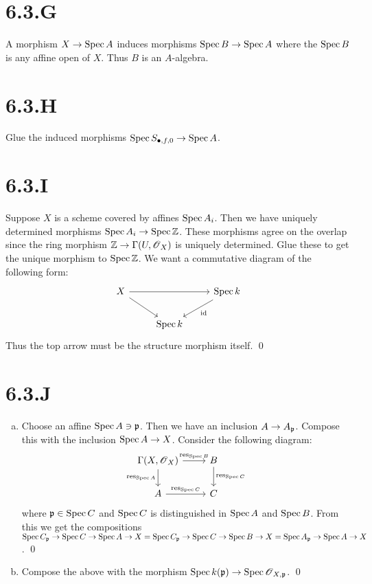 \documentclass{article}
\begin{document}
\section{6.3.G}
A morphism $X \to \operatorname{Spec} A$ induces morphisms $\operatorname{Spec} B \to \operatorname{Spec} A$ where the $\operatorname{Spec} B$ is any affine open of $X$. Thus $B$ is an $A$-algebra.

\section{6.3.H}
Glue the induced morphisms $\operatorname{Spec} S_{\bullet, f, 0} \to \operatorname{Spec} A$.

\section{6.3.I}
Suppose $X$ is a scheme covered by affines $\operatorname{Spec} A_i$. Then we have uniquely determined morphisms $\operatorname{Spec} A_i \to \operatorname{Spec} \mathbb{Z}$. These morphisms agree on the overlap since the ring morphism $\mathbb{Z} \to \Gamma(U, \operatorname{\mathscr{O}}_X)$ is uniquely determined. Glue these to get the unique morphism to $\operatorname{Spec} \mathbb{Z}$.
We want a commutative diagram of the following form:
\[
    \begin{tikzcd}
        X \ar[rr] \ar[dr] &         & \Spec k \ar[dl, "\text{id}"] \\
                          & \Spec k
    \end{tikzcd}
\]
Thus the top arrow must be the structure morphism itself. \qed

\section{6.3.J}
\begin{enumerate}[a.]
    \item Choose an affine $\operatorname{Spec} A \ni \mathfrak{p}$. Then we have an inclusion $A \to A_{\mathfrak{p}}$. Compose this with the inclusion $\operatorname{Spec} A \to X$. Consider the following diagram:
          \[
              \begin{tikzcd}
                  \Gamma(X, \Osh_X) \ar[d, "\operatorname{res}_{\Spec A}", swap] \ar[r, "\operatorname{res}_{\Spec B}"] & B\ar[d, "\operatorname{res}_{\Spec C}"] \\
                  A \ar[r, "\operatorname{res}_{\Spec C}"]                                                              & C
              \end{tikzcd}
          \]
          where $\mathfrak{p} \in \operatorname{Spec} C$ and $\operatorname{Spec} C$ is distinguished in $\operatorname{Spec} A$ and $\operatorname{Spec} B$. From this we get the compositions $\operatorname{Spec} C_{\mathfrak{p}} \to \operatorname{Spec} C \to \operatorname{Spec} A \to X = \operatorname{Spec} C_{\mathfrak{p}} \to \operatorname{Spec} C \to \operatorname{Spec} B \to X = \operatorname{Spec} A_{\mathfrak{p}} \to \operatorname{Spec} A \to X$. \qed
    \item Compose the above with the morphism $\operatorname{Spec} k(\mathfrak{p}) \to \operatorname{Spec} \operatorname{\mathscr{O}}_{X, \mathfrak{p}}$. \qed
\end{enumerate}
\end{document}
